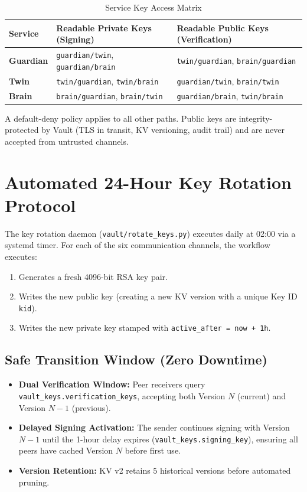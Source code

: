 \documentclass[11pt,a4paper]{article}
\begin{document}
\begin{table}[htbp]
\centering
\small
\caption{Service Key Access Matrix}
\begin{tabularx}{\textwidth}{lXX}
\toprule
\textbf{Service} & \textbf{Readable Private Keys (Signing)} & \textbf{Readable Public Keys (Verification)} \\
\midrule
\textbf{Guardian} & \texttt{guardian/twin}, \texttt{guardian/brain} & \texttt{twin/guardian}, \texttt{brain/guardian} \\
\textbf{Twin}     & \texttt{twin/guardian}, \texttt{twin/brain}     & \texttt{guardian/twin}, \texttt{brain/twin}     \\
\textbf{Brain}    & \texttt{brain/guardian}, \texttt{brain/twin}    & \texttt{guardian/brain}, \texttt{twin/brain}    \\
\bottomrule
\end{tabularx}
\end{table}

\noindent A default-deny policy applies to all other paths. Public keys are integrity-protected by Vault (TLS in transit, KV versioning, audit trail) and are never accepted from untrusted channels.

\section{Automated 24-Hour Key Rotation Protocol}
The key rotation daemon (\texttt{vault/rotate\_keys.py}) executes daily at 02:00 via a systemd timer. For each of the six communication channels, the workflow executes:
\begin{enumerate}[leftmargin=*,itemsep=2pt]
  \item Generates a fresh 4096-bit RSA key pair.
  \item Writes the new public key (creating a new KV version with a unique Key ID \texttt{kid}).
  \item Writes the new private key stamped with \texttt{active\_after = now + 1h}.
\end{enumerate}

\subsection{Safe Transition Window (Zero Downtime)}
\begin{itemize}[leftmargin=*,itemsep=2pt]
  \item \textbf{Dual Verification Window:} Peer receivers query \texttt{vault\_keys.verification\_keys}, accepting both Version $N$ (current) and Version $N-1$ (previous).
  \item \textbf{Delayed Signing Activation:} The sender continues signing with Version $N-1$ until the 1-hour delay expires (\texttt{vault\_keys.signing\_key}), ensuring all peers have cached Version $N$ before first use.
  \item \textbf{Version Retention:} KV v2 retains 5 historical versions before automated pruning.
\end{itemize}
\end{document}
